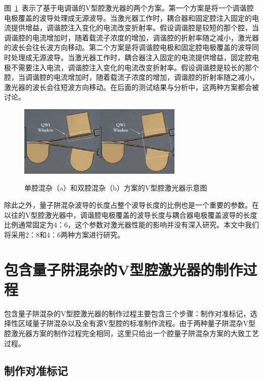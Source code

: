 \documentclass{ZJUthesis}
\begin{document}
图~\ref{fig_vccl_qwi_strategies}~表示了基于电调谐的V型腔激光器的两个方案。第一个方案是将一个调谐腔电极覆盖的波导处理成无源波导。当激光器工作时，耦合器和固定腔注入固定的电流提供增益，调谐腔注入变化的电流改变折射率。假设调谐腔是较短的那个腔，当调谐腔的电流增加时，随着载流子浓度的增加，调谐腔的折射率随之减小，激光器的波长会往长波方向移动。第二个方案是将调谐腔电极和固定腔电极覆盖的波导同时处理成无源波导。当激光器工作时，耦合器注入固定的电流提供增益，固定腔电极不需要注入电流，调谐腔注入变化的电流改变折射率。假设调谐腔是较长的那个腔，当调谐腔的电流增加时，随着载流子浓度的增加，调谐腔的折射率随之减小，激光器的波长会往短波方向移动。在后面的测试结果与分析中，这两种方案都会被讨论。

\begin{figure}[htbp]
  \centering
  \includegraphics[width=0.7\textwidth]{./Pictures/vccl_qwi_strategies.eps}\\
  \caption{单腔混杂（a）和双腔混杂（b）方案的V型腔激光器示意图}
  \label{fig_vccl_qwi_strategies}
\end{figure}

除此之外，量子阱混杂波导的长度占整个波导长度的比例也是一个重要的参数。在以往的V型腔激光器中，调谐腔电极覆盖的波导长度与耦合器电极覆盖波导的长度比例通常固定为4：6，这个参数对激光器性能的影响并没有深入研究。本文中我们将采用2：8和4：6两种方案进行研究。

\section{包含量子阱混杂的V型腔激光器的制作过程}

包含量子阱混杂的V型腔激光器的制作过程主要包含三个步骤：制作对准标记，选择性区域量子阱混杂以及全有源V型腔的标准制作流程。由于两种量子阱混杂V型腔激光器方案的制作过程完全相同，这里只给出一个腔量子阱混杂方案的大致工艺过程。

\subsection{制作对准标记}
\end{document}
